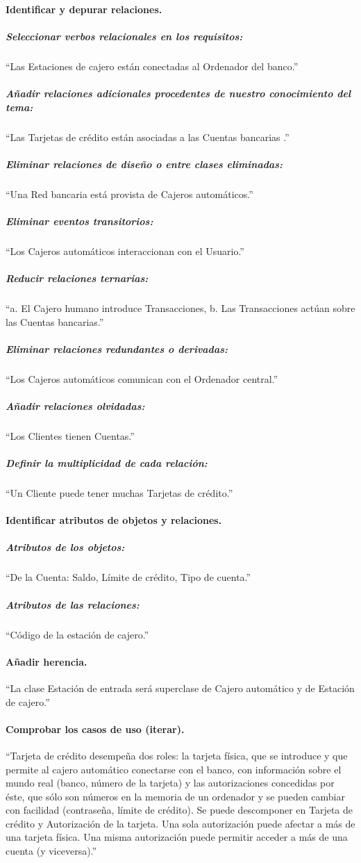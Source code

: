 \documentclass[spanish,12pt,letterpapper]{article}
\begin{document}
	\paragraph{Identificar y depurar relaciones.}
	\subparagraph{Seleccionar verbos relacionales en los requisitos:} ``Las Estaciones de cajero están conectadas al Ordenador del banco.''
	\subparagraph{Añadir relaciones adicionales procedentes de nuestro conocimiento del tema:} ``Las Tarjetas de crédito están asociadas a las Cuentas bancarias .''
	\subparagraph{Eliminar relaciones de diseño o entre clases eliminadas:} ``Una Red bancaria está provista de Cajeros automáticos.''
	\subparagraph{Eliminar eventos transitorios:} ``Los Cajeros automáticos interaccionan con el Usuario.''
	\subparagraph{Reducir relaciones ternarias:}``a. El Cajero humano introduce Transacciones, b. Las Transacciones actúan sobre las Cuentas bancarias.''
	\subparagraph{Eliminar relaciones redundantes o derivadas:}``Los Cajeros automáticos comunican con el Ordenador central.''
	\subparagraph{Añadir relaciones olvidadas:}``Los Clientes tienen Cuentas.''
	\subparagraph{Definir la multiplicidad de cada relación:}``Un Cliente puede tener muchas Tarjetas de crédito.''
	
	\paragraph{Identificar atributos de objetos y relaciones.}
	\subparagraph{Atributos de los objetos:}``De la Cuenta: Saldo, Límite de crédito, Tipo de cuenta.''
	\subparagraph{Atributos de las relaciones:}``Código de la estación de cajero.''
	
	\paragraph{Añadir herencia.}``La clase Estación de entrada será superclase de Cajero automático y de Estación de cajero.''
	
	\paragraph{Comprobar los casos de uso (iterar).} ``Tarjeta de crédito desempeña dos roles: la tarjeta física, que se introduce y que permite al cajero automático conectarse con el banco, con información sobre el mundo real (banco, número de la tarjeta) y las autorizaciones concedidas por éste, que sólo son números en la memoria de un ordenador y se pueden cambiar con facilidad (contraseña, límite de crédito). Se puede descomponer en Tarjeta de crédito y Autorización de la tarjeta. Una sola autorización puede afectar a más de una tarjeta física. Una misma autorización puede permitir acceder a más de una cuenta (y viceversa).''
	
\end{document}
